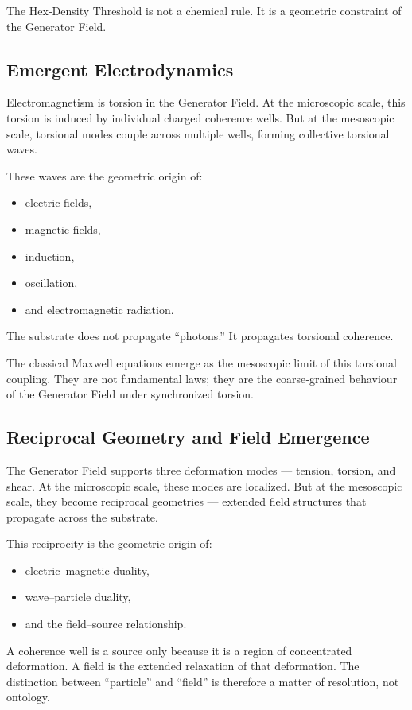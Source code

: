 \documentclass[reprint,amsmath,amssymb,aps,prl,floatfix]{revtex4-2}
\begin{document}
\begin{itemize}
The Hex‑Density Threshold is not a chemical rule.  
It is a geometric constraint of the Generator Field.

\subsection{Emergent Electrodynamics}

Electromagnetism is torsion in the Generator Field. At the microscopic scale, this torsion is induced by individual charged coherence wells. But at the mesoscopic scale, torsional modes couple across multiple wells, forming collective torsional waves.
\medskip

These waves are the geometric origin of:
\begin{itemize}
\item electric fields,  
\item magnetic fields,  
\item induction,  
\item oscillation,  
\item and electromagnetic radiation.
\end{itemize}
\medskip
\medskip
The substrate does not propagate “photons.”  
It propagates torsional coherence.
\medskip

The classical Maxwell equations emerge as the mesoscopic limit of this torsional coupling. They are not fundamental laws; they are the coarse‑grained behaviour of the Generator Field under synchronized torsion.

\subsection{Reciprocal Geometry and Field Emergence}

The Generator Field supports three deformation modes — tension, torsion, and shear. At the microscopic scale, these modes are localized. But at the mesoscopic scale, they become reciprocal geometries — extended field structures that propagate across the substrate.
\medskip

This reciprocity is the geometric origin of:
\begin{itemize}
\item electric–magnetic duality,  
\item wave–particle duality,  
\item and the field–source relationship.
\end{itemize}
\medskip

A coherence well is a source only because it is a region of concentrated deformation. A field is the extended relaxation of that deformation. The distinction between “particle” and “field” is therefore a matter of resolution, not ontology.


\end{itemize}
\end{document}
